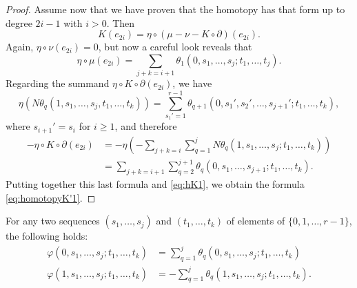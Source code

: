 \begin{proof}
	Assume now that we have proven that the homotopy has that form up to degree $2i-1$ with $i>0$. Then
	\[K(e_{2i}) = \eta\circ (\mu-\nu-K\circ\partial)(e_{2i}).\]
	Again, $\eta\circ\nu(e_{2i}) = 0$, but now a careful look reveals that
	\begin{equation}\label{eq:hK1}\eta\circ\mu(e_{2i}) = \sum_{j+k=i+1}\theta_1(0,s_1,\ldots,s_j;t_1,\ldots,t_j).
	\end{equation}
	Regarding the summand $\eta\circ K\circ \partial(e_{2i})$, we have
	\[\eta(N\theta_q(1,s_1,\ldots,s_j,t_1,\ldots,t_k)) = \sum_{s_1' = 1}^{r-1}\theta_{q+1}(0,s_1',s_2',\ldots,s_{j+1}';t_1,\ldots,t_k),\]
	where $s_{i+1}' = s_i$ for $i\geq 1$, and therefore
	\begin{align*} \label{eq:hK2}
		-\eta\circ K\circ\partial(e_{2i})
		&= -\eta\left(-\sum_{j+k = i}\sum_{q=1}^j N\theta_q(1,s_1,\ldots,s_j;t_1,\ldots,t_k)\right) \\
		&= \sum_{j+k = i+1}\sum_{q=2}^{j+1}\theta_q(0,s_1,\ldots,s_{j+1};t_1,\ldots,t_k).
	\end{align*}
	Putting together this last formula and \eqref{eq:hK1}, we obtain the formula \eqref{eq:homotopyK'1}.
\end{proof}

\begin{lemma}\label{l:homotopyK''}
	For any two sequences $(s_1,\ldots,s_j)$ and $(t_1,\ldots,t_k)$ of elements of $\{0,1,\ldots,r-1\}$, the following holds:
	\begin{align*}
		\varphi(0,s_1,\ldots,s_j;t_1,\ldots,t_k) &= \sum_{q=1}^j \theta_q(0,s_1,\ldots,s_j;t_1,\ldots,t_k) \\
		\varphi(1,s_1,\ldots,s_j;t_1,\ldots,t_k) &= -\sum_{q=1}^j \theta_q(1,s_1,\ldots,s_j;t_1,\ldots,t_k).
	\end{align*}
\end{lemma}

